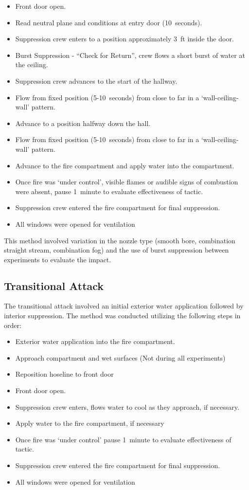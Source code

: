 \documentclass[12pt,oneside]{book}
\begin{document}
\begin{itemize}
	\item{Front door open.}
	\item{Read neutral plane and conditions at entry door (10~seconds).}
	\item{Suppression crew enters to a position approximately 3~ft inside the door.}
	\item{Burst Suppression - ``Check for Return'', crew flows a short burst of water at the ceiling.}
	\item{Suppression crew advances to the start of the hallway.}
	\item{Flow from fixed position (5-10~seconds) from close to far in a `wall-ceiling-wall' pattern.}
	\item{Advance to a position halfway down the hall.}
	\item{Flow from fixed position (5-10~seconds) from close to far in a `wall-ceiling-wall' pattern.}
	\item{Advance to the fire compartment and apply water into the compartment.}
	\item{Once fire was `under control', visible flames or audible signs of combustion were absent, pause 1~minute to evaluate effectiveness of tactic.}
	\item{Suppression crew entered the fire compartment for final suppression.}
	\item{All windows were opened for ventilation}
\end{itemize}

This method involved variation in the nozzle type (smooth bore, combination straight stream, combination fog) and the use of burst suppression between experiments to evaluate the impact. 

\clearpage

\subsection{Transitional Attack}
The transitional attack involved an initial exterior water application followed by interior suppression. The method was conducted utilizing the following steps in order:

\begin{itemize}
	\item{Exterior water application into the fire compartment.}
	\item{Approach compartment and wet surfaces (Not during all experiments)}
	\item{Reposition hoseline to front door}
	\item{Front door open.}
	\item{Suppression crew enters, flows water to cool as they approach, if necessary.}
	\item{Apply water to the fire compartment, if necessary}
	\item{Once fire was `under control' pause 1~minute to evaluate effectiveness of tactic.}
	\item{Suppression crew entered the fire compartment for final suppression.}
	\item{All windows were opened for ventilation}
\end{itemize}
\end{document}
